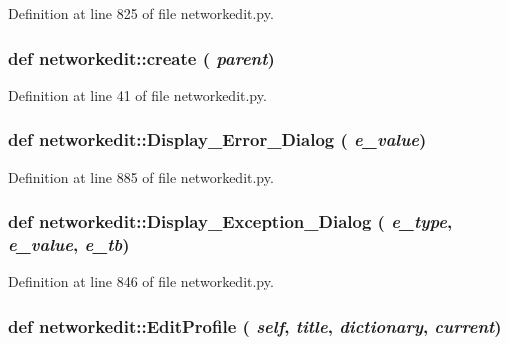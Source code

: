 Definition at line 825 of file networkedit.py.\hypertarget{namespacenetworkedit_dda6cbf16074f4596324bd8c75e7a409}{
\subsubsection[create]{\setlength{\rightskip}{0pt plus 5cm}def networkedit::create ( {\em parent})}}
\label{namespacenetworkedit_dda6cbf16074f4596324bd8c75e7a409}




Definition at line 41 of file networkedit.py.\hypertarget{namespacenetworkedit_f360c16d50fb1b076b07b3ea901302ac}{
\subsubsection[Display\_\-Error\_\-Dialog]{\setlength{\rightskip}{0pt plus 5cm}def networkedit::Display\_\-Error\_\-Dialog ( {\em e\_\-value})}}
\label{namespacenetworkedit_f360c16d50fb1b076b07b3ea901302ac}




Definition at line 885 of file networkedit.py.\hypertarget{namespacenetworkedit_001372e9d0f0b0629c6516977265dcbc}{
\subsubsection[Display\_\-Exception\_\-Dialog]{\setlength{\rightskip}{0pt plus 5cm}def networkedit::Display\_\-Exception\_\-Dialog ( {\em e\_\-type},  {\em e\_\-value},  {\em e\_\-tb})}}
\label{namespacenetworkedit_001372e9d0f0b0629c6516977265dcbc}




Definition at line 846 of file networkedit.py.\hypertarget{namespacenetworkedit_5bab65ca0184167cc1b28511385d3222}{
\subsubsection[EditProfile]{\setlength{\rightskip}{0pt plus 5cm}def networkedit::Edit\-Profile ( {\em self},  {\em title},  {\em dictionary},  {\em current})}}
\label{namespacenetworkedit_5bab65ca0184167cc1b28511385d3222}




